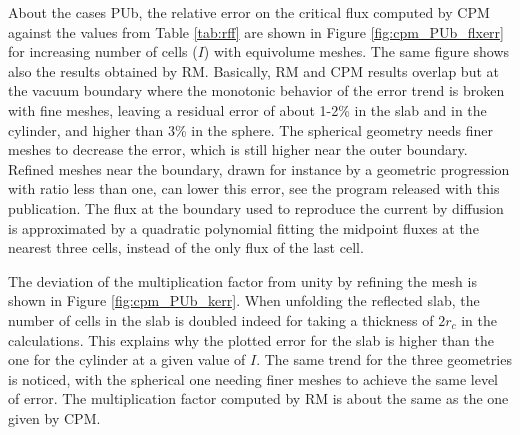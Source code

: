 \documentclass{ictt26}
\begin{document}
About the cases PUb, the relative error on the critical flux computed by CPM against the values from Table \ref{tab:rff} are shown in Figure \ref{fig:cpm_PUb_flxerr} for increasing number of cells ($I$) with equivolume meshes. The same figure shows also the results obtained by RM. Basically, RM and CPM results overlap but at the vacuum boundary where the monotonic behavior of the error trend is broken with fine meshes, leaving a residual error of about 1-2\% in the slab and in the cylinder, and higher than 3\% in the sphere. The spherical geometry needs finer meshes to decrease the error, which is still higher near the outer boundary. Refined meshes near the boundary, drawn for instance by a geometric progression with ratio less than one, can lower this error, see the program released with this publication. The flux at the boundary used to reproduce the current by diffusion is approximated by a quadratic polynomial fitting the midpoint fluxes at the nearest three cells, instead of the only flux of the last cell.

The deviation of the multiplication factor from unity by refining the mesh is shown in Figure \ref{fig:cpm_PUb_kerr}. When unfolding the reflected slab, the number of cells in the slab is doubled indeed for taking a thickness of $2r_c$ in the calculations. This explains why the plotted error for the slab is higher than the one for the cylinder at a given value of $I$. The same trend for the three geometries is noticed, with the spherical one needing finer meshes to achieve the same level of error. The multiplication factor computed by RM is about the same as the one given by CPM.
\end{document}
